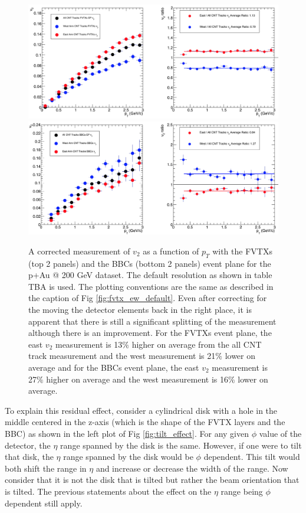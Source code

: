 \begin{figure}[!h]
\begin{center}
\includegraphics[width=0.85\linewidth]{figs/fvtx_vertex_rot_only.png}
\includegraphics[width=0.85\linewidth]{figs/bbc_vertex_rot_only.png}
\caption{A corrected measurement of $v_{2}$ as a function of $p_T$ with the FVTXs (top 2 panels) and the BBCs (bottom 2 panels) event plane for the p+Au @ 200 GeV dataset. The default resolution as shown in table TBA is used. The plotting conventions are the same as described in the caption of Fig \ref{fig:fvtx_ew_default}. Even after correcting for the moving the detector elements back in the right place, it is apparent that there is still a significant splitting of the measurement although there is an improvement. For the FVTXs event plane, the east $v_2$ measurement is 13$\%$ higher on average from the all CNT track measurement and the west measurement is 21$\%$ lower on average and for the BBCs event plane, the east $v_2$ measurement is 27$\%$ higher on average and the west measurement is 16$\%$ lower on average.}
\label{fig:fvtx_ew_rot}
\end{center}
\end{figure}

To explain this residual effect, consider a cylindrical disk with a hole in the middle centered in the z-axis (which is the shape of the FVTX layers and the BBC) as shown in the left plot of Fig \ref{fig:tilt_effect}. For any given $\phi$ value of the detector, the $\eta$ range spanned by the disk is the same. However, if one were to tilt that disk, the $\eta$ range spanned by the disk would be $\phi$ dependent. This tilt would both shift the range in $\eta$ and increase or decrease the width of the range. Now consider that it is not the disk that is tilted but rather the beam orientation that is tilted. The previous statements about the effect on the $\eta$ range being $\phi$ dependent still apply. 

